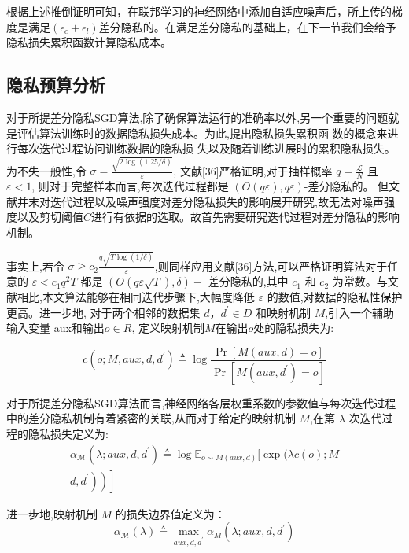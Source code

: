 根据上述推倒证明可知，在联邦学习的神经网络中添加自适应噪声后，所上传的梯度是满足$\left(\epsilon_{c}+\epsilon_{l}\right)$差分隐私的。在满足差分隐私的基础上，在下一节我们会给予隐私损失累积函数计算隐私成本。

\subsection{隐私预算分析}
对于所提差分隐私SGD算法,除了确保算法运行的准确率以外,另一个重要的问题就是评估算法训练时的数据隐私损失成本。为此,提出隐私损失累积函 数的概念来进行每次迭代过程访问训练数据的隐私损 失以及随着训练进展时的累积隐私损失。
为不失一般性,令 $\sigma=\frac{\sqrt{2 \log (1.25 / \delta)}}{\varepsilon}$, 文献[36]严格证明,对于抽样概率 $q=\frac{\mathcal{L}}{N}$ 且 $\varepsilon<1$, 则对于完整样本而言,每次迭代过程都是 $(O(q \varepsilon), q \varepsilon)$-差分隐私的。 但文献并末对迭代过程以及噪声强度对差分隐私损失的影响展开研究,故无法对噪声强度以及剪切阈值$C$进行有依据的选取。故首先需要研究迭代过程对差分隐私的影响机制。

事实上,若令 $\sigma \geqslant c_{2} \frac{q \sqrt{T \log (1 / \delta)}}{\varepsilon}$,则同样应用文献[36]方法,可以严格证明算法对于任意的 $\varepsilon<c_{1} q^{2} T$ 都是 $(O(q \varepsilon \sqrt{T}), \delta)-$ 差分隐私的,其中 $c_{1}$ 和 $c_{2}$ 为常数。与文献\cite{ref36}相比,本文算法能够在相同迭代步骤下,大幅度降低 $\varepsilon$ 的数值,对数据的隐私性保护更高。进一步地, 对于两个相邻的数据集 $d$，$d^{\prime} \in D$ 和映射机制 $M$,引入一个辅助输入变量 aux和输出$o \in R$, 定义映射机制$M$在输出$o$处的隐私损失为:

$$
c\left(o ; M, a u x, d, d^{\prime}\right) \triangleq \log \frac{\operatorname{Pr}[M(a u x, d)=o]}{\operatorname{Pr}\left[M\left(a u x, d^{\prime}\right)=o\right]}
$$

对于所提差分隐私SGD算法而言,神经网络各层权重系数的参数值与每次迭代过程中的差分隐私机制有着紧密的关联,从而对于给定的映射机制 $M$,在第 $\lambda$ 次迭代过程的隐私损失定义为:
\begin{equation}\label{eq:隐私损失定义}
\begin{array}{r}
\alpha_{\mathcal{M}}\left(\lambda ; a u x, d, d^{\prime}\right) \triangleq \log \mathbb{E}_{o \sim M(a u x, d)}[\exp (\lambda c(o) ; M \\
\left.\left.\left.d, d^{\prime}\right)\right)\right]
\end{array}
\end{equation}

进一步地,映射机制 $M$ 的损失边界值定义为：
\begin{equation}\label{eq:损失边界值定义}
\alpha_{\mathcal{M}}(\lambda) \triangleq \max _{a u x, d, d^{\prime}} \alpha_{M}\left(\lambda ; a u x, d, d^{\prime}\right)
\end{equation}

